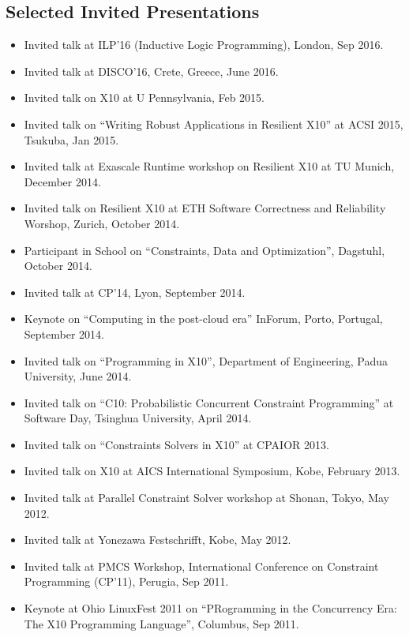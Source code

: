 \documentclass{article}
\begin{document}

\subsection*{Selected Invited Presentations}
\begin{itemize}
\item Invited talk at ILP'16 (Inductive Logic Programming), London, Sep 2016. 
\item Invited talk at DISCO'16, Crete, Greece, June 2016.
\item Invited talk on X10 at U Pennsylvania, Feb 2015.
\item Invited talk on ``Writing Robust Applications in Resilient X10'' at ACSI 2015, Tsukuba, Jan 2015.
\item Invited talk at Exascale Runtime workshop on Resilient X10 at TU Munich, December 2014.
\item Invited talk on Resilient X10 at ETH Software Correctness and Reliability Worshop, Zurich, October 2014. 
\item Participant in School on ``Constraints, Data and Optimization'', Dagstuhl, October 2014. 
\item Invited talk at CP'14, Lyon, September 2014.
\item Keynote on ``Computing in the post-cloud era'' InForum, Porto, Portugal, September 2014.
\item Invited talk on ``Programming in X10'', Department of Engineering, Padua University, June 2014.
\item Invited talk on ``C10: Probabilistic Concurrent Constraint Programming'' at Software Day, Tsinghua University, April 2014. 
\item Invited talk on ``Constraints Solvers in X10'' at CPAIOR 2013.
\item Invited talk on X10 at AICS International Symposium, Kobe, February 2013.
\item Invited talk at Parallel Constraint Solver workshop at Shonan, Tokyo, May 2012.
\item Invited talk at Yonezawa Festschrifft, Kobe, May 2012.
\item Invited talk at PMCS Workshop, International Conference on
  Constraint Programming (CP'11), Perugia, Sep 2011.
\item Keynote at Ohio LinuxFest 2011 on ``PRogramming in the
  Concurrency Era: The X10 Programming Language'', Columbus, Sep 2011.  

\end{itemize}
\end{document}
